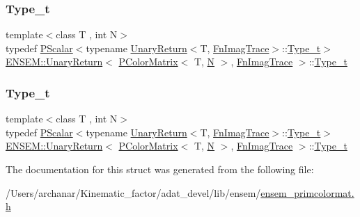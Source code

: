 \subsubsection{\texorpdfstring{Type\_t}{Type\_t}\hspace{0.1cm}{\footnotesize\ttfamily [1/2]}}
{\footnotesize\ttfamily template$<$class T , int N$>$ \\
typedef \mbox{\hyperlink{classENSEM_1_1PScalar}{P\+Scalar}}$<$typename \mbox{\hyperlink{structENSEM_1_1UnaryReturn}{Unary\+Return}}$<$T, \mbox{\hyperlink{structENSEM_1_1FnImagTrace}{Fn\+Imag\+Trace}}$>$\+::\mbox{\hyperlink{structENSEM_1_1UnaryReturn_3_01PColorMatrix_3_01T_00_01N_01_4_00_01FnImagTrace_01_4_a8af03bca3da42c1840803fcbcdf3ad74}{Type\+\_\+t}}$>$ \mbox{\hyperlink{structENSEM_1_1UnaryReturn}{E\+N\+S\+E\+M\+::\+Unary\+Return}}$<$ \mbox{\hyperlink{classENSEM_1_1PColorMatrix}{P\+Color\+Matrix}}$<$ T, \mbox{\hyperlink{operator__name__util_8cc_a7722c8ecbb62d99aee7ce68b1752f337}{N}} $>$, \mbox{\hyperlink{structENSEM_1_1FnImagTrace}{Fn\+Imag\+Trace}} $>$\+::\mbox{\hyperlink{structENSEM_1_1UnaryReturn_3_01PColorMatrix_3_01T_00_01N_01_4_00_01FnImagTrace_01_4_a8af03bca3da42c1840803fcbcdf3ad74}{Type\+\_\+t}}}

\mbox{\label{structENSEM_1_1UnaryReturn_3_01PColorMatrix_3_01T_00_01N_01_4_00_01FnImagTrace_01_4_a8af03bca3da42c1840803fcbcdf3ad74}} 
\subsubsection{\texorpdfstring{Type\_t}{Type\_t}\hspace{0.1cm}{\footnotesize\ttfamily [2/2]}}
{\footnotesize\ttfamily template$<$class T , int N$>$ \\
typedef \mbox{\hyperlink{classENSEM_1_1PScalar}{P\+Scalar}}$<$typename \mbox{\hyperlink{structENSEM_1_1UnaryReturn}{Unary\+Return}}$<$T, \mbox{\hyperlink{structENSEM_1_1FnImagTrace}{Fn\+Imag\+Trace}}$>$\+::\mbox{\hyperlink{structENSEM_1_1UnaryReturn_3_01PColorMatrix_3_01T_00_01N_01_4_00_01FnImagTrace_01_4_a8af03bca3da42c1840803fcbcdf3ad74}{Type\+\_\+t}}$>$ \mbox{\hyperlink{structENSEM_1_1UnaryReturn}{E\+N\+S\+E\+M\+::\+Unary\+Return}}$<$ \mbox{\hyperlink{classENSEM_1_1PColorMatrix}{P\+Color\+Matrix}}$<$ T, \mbox{\hyperlink{operator__name__util_8cc_a7722c8ecbb62d99aee7ce68b1752f337}{N}} $>$, \mbox{\hyperlink{structENSEM_1_1FnImagTrace}{Fn\+Imag\+Trace}} $>$\+::\mbox{\hyperlink{structENSEM_1_1UnaryReturn_3_01PColorMatrix_3_01T_00_01N_01_4_00_01FnImagTrace_01_4_a8af03bca3da42c1840803fcbcdf3ad74}{Type\+\_\+t}}}



The documentation for this struct was generated from the following file\+:\begin{DoxyCompactItemize}
\item 
/\+Users/archanar/\+Kinematic\+\_\+factor/adat\+\_\+devel/lib/ensem/\mbox{\hyperlink{lib_2ensem_2ensem__primcolormat_8h}{ensem\+\_\+primcolormat.\+h}}\end{DoxyCompactItemize}
